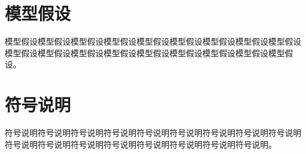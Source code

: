 \documentclass[bwprint]{gmcmthesis}
\numberwithin{figure}{section}
\begin{document}
\section{模型假设}
模型假设模型假设模型假设模型假设模型假设模型假设模型假设模型假设模型假设模型假设模型假设模型假设模型假设模型假设模型假设模型假设模型假设模型假设。


\section{符号说明}
符号说明符号说明符号说明符号说明符号说明符号说明符号说明符号说明符号说明符号说明符号说明符号说明符号说明符号说明符号说明符号说明符号说明。
\end{document}
